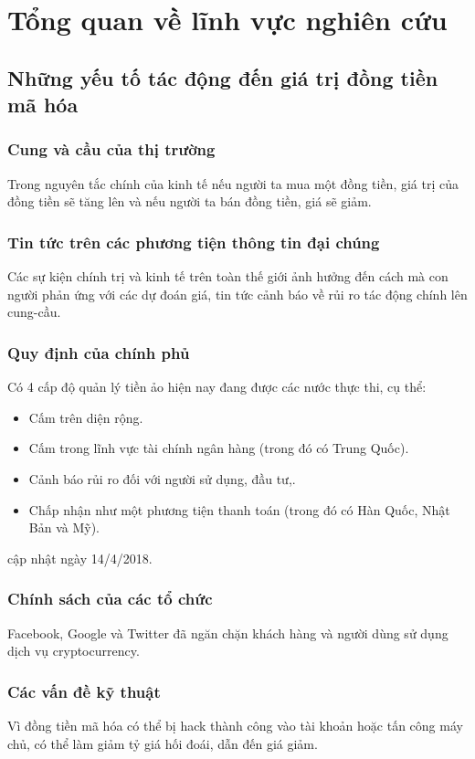 \chapter{Tổng quan về lĩnh vực nghiên cứu} 
\section{Những yếu tố tác động đến giá trị đồng tiền mã hóa}
\subsection{Cung và cầu của thị trường}
Trong nguyên tắc chính của kinh tế nếu người ta mua một đồng tiền, giá trị của đồng tiền sẽ tăng lên và nếu người ta bán đồng tiền, giá sẽ giảm.
\subsection{Tin tức trên các phương tiện thông tin đại chúng}
Các sự kiện chính trị và kinh tế trên toàn thế giới ảnh hưởng đến cách mà con người phản ứng với các dự đoán giá, tin tức cảnh báo về rủi ro tác động chính lên cung-cầu.
\subsection{Quy định của chính phủ}
Có 4 cấp độ quản lý tiền ảo hiện nay đang được các nước thực thi, cụ thể:
\begin{itemize}
\item Cấm trên diện rộng.
\item Cấm trong lĩnh vực tài chính ngân hàng (trong đó có Trung Quốc).
\item Cảnh báo rủi ro đối với người sử dụng, đầu tư,.
\item  Chấp nhận như một phương tiện thanh toán (trong đó có Hàn Quốc, Nhật Bản và Mỹ).
\end{itemize}
cập nhật ngày 14/4/2018.
\subsection{Chính sách của các tổ chức}
Facebook, Google và Twitter đã ngăn chặn khách hàng và người dùng sử dụng dịch vụ cryptocurrency.
\subsection{Các vấn đề kỹ thuật}
Vì đồng tiền mã hóa có thể bị hack thành công vào tài khoản hoặc tấn công máy chủ, có thể làm giảm tỷ giá hối đoái, dẫn đến giá giảm.
